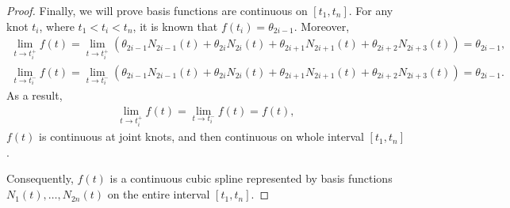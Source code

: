 \begin{proof}
Finally, we will prove basis functions are continuous on $[t_1, t_n]$. For any knot $t_i$, where $t_1< t_i <t_n$, it is known that $f(t_i)=\theta_{2i-1}$. Moreover, 
\begin{align*}
\lim\limits_{t\to t_i^+} f(t) = \lim\limits_{t\to t_i^+} \left(\theta_{2i-1}N_{2i-1}(t)+\theta_{2i}N_{2i}(t)+\theta_{2i+1}N_{2i+1}(t)+\theta_{2i+2}N_{2i+3}(t)\right)=\theta_{2i-1},\\
\lim\limits_{t\to t_i^-} f(t) = \lim\limits_{t\to t_i^-} \left(\theta_{2i-1}N_{2i-1}(t)+\theta_{2i}N_{2i}(t)+\theta_{2i+1}N_{2i+1}(t)+\theta_{2i+2}N_{2i+3}(t)\right)=\theta_{2i-1}.
\end{align*}
As a result, 
\begin{align*}
\lim\limits_{t\to t_i^+} f(t) =\lim\limits_{t\to t_i^-} f(t) =f(t),
\end{align*}
$f(t)$ is continuous at joint knots, and then continuous on whole interval $[t_1,t_n]$.

Consequently, $f(t)$ is a continuous cubic spline represented by basis functions $N_1(t),\ldots,N_{2n}(t)$ on the entire interval $[t_1,t_n]$. 
\end{proof}



